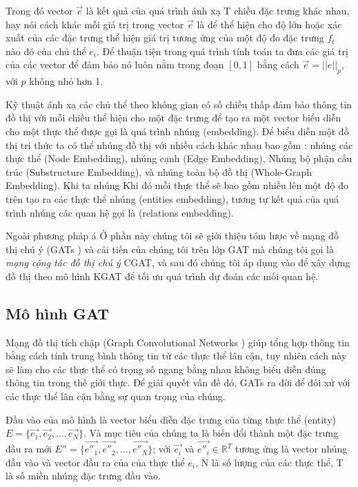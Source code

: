 Trong đó vector $\overrightarrow{e}$ là kết quả của quá trình ánh xạ T chiều đặc trưng khác nhau, hay nói cách khác mỗi giá trị trong vector \(\overrightarrow{e}\) là để thể hiện cho độ lớn hoặc xác xuất của các đặc trưng thể hiện giá trị tương ứng của một độ đo đặc trưng $f_t$ nào đó của chủ thể $e_i$. Để thuận tiện trong quá trình tính toán ta đưa các giá trị của các vector để đảm bảo nó luôn nằm trong đoạn $[0, 1]$ bằng cách  $\overrightarrow{e} = || e ||_p$, với $p$ không nhỏ hơn 1.

Kỹ thuật ánh xạ các chủ thể theo không gian có số chiều thấp đảm bảo thông tin đồ thị với mỗi chiều thể hiện cho một đặc trưng để tạo ra một vector biểu diễn cho một thực thể được gọi là quá trình nhúng (embedding). Để biểu diễn một đồ thị tri thức ta có thể nhúng đồ thị với nhiều cách khác nhau bao gồm : nhúng các thực thể (Node Embedding), nhúng cạnh (Edge Embedding), Nhúng bộ phận cấu trúc (Substructure Embedding), và nhúng toàn bộ đồ thị (Whole-Graph Embedding). Khi ta nhúng Khi đó mỗi thực thể sẽ bao gồm nhiều  lên một độ đo trên tạo ra các thực thể nhúng (entities embedding), tương tự kết quả của quá trình nhúng các quan hệ gọi là (relations embedding).

Ngoài phương pháp á
Ở phần này chúng tôi sẽ giới thiệu tóm lược về mạng đồ thị chú ý (GATs \cite{velivckovic2017graph}) và cải tiến của chúng tôi trên lớp GAT mà chúng tôi gọi là \textit{mạng cộng tác đồ thị chú ý} CGAT, và sau đó chúng tôi áp dụng vào để xây dựng đồ thị theo mô hình KGAT \cite{nathani2019learning} để tối ưu quá trình dự đoán các mối quan hệ. 

\subsection{Mô hình GAT}

Mạng đồ thị tích chập (Graph Convolutional Networks ) giúp tổng hợp thông tin bằng cách tính trung bình thông tin từ các thực thể lân cận, tuy nhiên cách này sẽ làm cho các thực thể có trọng số ngang bằng nhau không biểu diễn đúng thông tin trong thế giới thực. Để giải quyết vấn đề đó, GATs \cite{velivckovic2017graph} ra đời để đối xử với các thực thể lân cận bằng sự quan trọng của chúng.

Đầu vào của mô hình là vector biểu diễn đặc trưng của từng thực thể (entity) $E = \Big\{\overrightarrow{e_1}, \overrightarrow{e_2}, ...,  \overrightarrow{e_N}\Big\}$. Và mục tiêu của chúng ta là biến đổi thành một đặc trưng đầu ra mới $E'' = \Big\{\overrightarrow{e''_1}, \overrightarrow{e''_2}, ...,  \overrightarrow{e''_N}\Big\}$; với $\overrightarrow{e_i}$ và $\overrightarrow{e''_i} \in \mathbb{R}^T$ tương ứng là vector nhúng đầu vào và vector đầu ra của của thực thể $e_i$, N là số lượng của các thực thể, T là số miền nhúng đặc trưng đầu vào.

